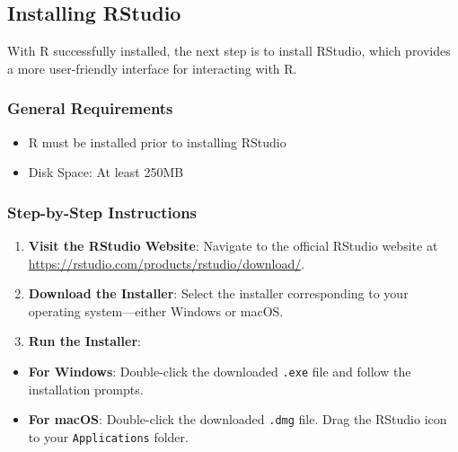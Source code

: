 \documentclass[
  b5paper]{book}
\providecommand{\tightlist}{%
  \setlength{\itemsep}{0pt}\setlength{\parskip}{0pt}}
\begin{document}
\hypertarget{installing-rstudio}{%
\subsection*{Installing RStudio}\label{installing-rstudio}}

With R successfully installed, the next step is to install RStudio, which provides a more user-friendly interface for interacting with R.

\hypertarget{general-requirements}{%
\subsubsection*{General Requirements}\label{general-requirements}}

\begin{itemize}
\tightlist
\item
  R must be installed prior to installing RStudio
\item
  Disk Space: At least 250MB
\end{itemize}

\hypertarget{step-by-step-instructions-2}{%
\subsubsection*{Step-by-Step Instructions}\label{step-by-step-instructions-2}}

\begin{enumerate}
\def\labelenumi{\arabic{enumi}.}
\item
  \textbf{Visit the RStudio Website}: Navigate to the official RStudio website at \url{https://rstudio.com/products/rstudio/download/}.
\item
  \textbf{Download the Installer}: Select the installer corresponding to your operating system---either Windows or macOS.
\item
  \textbf{Run the Installer}:
\end{enumerate}

\begin{itemize}
\tightlist
\item
  \textbf{For Windows}: Double-click the downloaded \texttt{.exe} file and follow the installation prompts.
\item
  \textbf{For macOS}: Double-click the downloaded \texttt{.dmg} file. Drag the RStudio icon to your \texttt{Applications} folder.
\end{itemize}
\end{document}
